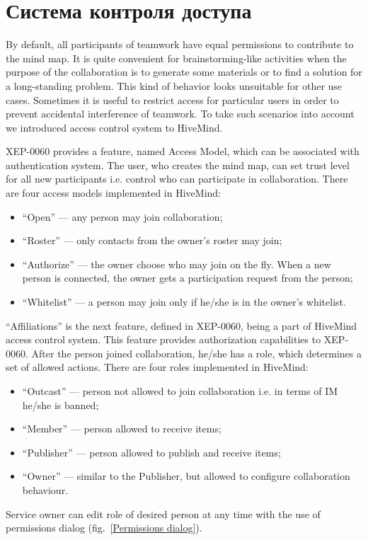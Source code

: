 \section{Система контроля доступа}

By default, all participants of teamwork have equal permissions to contribute to
the mind map. It is quite convenient for brainstorming-like activities when the
purpose of the collaboration is to generate some materials or to find a solution
for a long-standing problem. This kind of behavior looks unsuitable for other
use cases. Sometimes it is useful to restrict access for particular users in
order to prevent accidental interference of teamwork. To take such scenarios
into account we introduced access control system to HiveMind.

XEP-0060 provides a feature, named Access Model, which can be associated with
authentication system. The user, who creates the mind map, can set trust level
for all new participants i.e. control who can participate in collaboration.
There are four access models implemented in HiveMind:
\begin{itemize}
\item ``Open'' --- any person may join collaboration;
\item ``Roster'' --- only contacts from the owner’s roster may join;
\item ``Authorize'' --- the owner choose who may join on the fly. When a new
  person is connected, the owner gets a participation request from the person;
\item ``Whitelist'' --- a person may join only if he/she is in the owner’s
  whitelist.
\end{itemize}

``Affiliations'' is the next feature, defined in XEP-0060, being a part of
HiveMind access control system. This feature provides authorization capabilities
to XEP-0060. After the person joined collaboration, he/she has a role, which
determines a set of allowed actions. There are four roles implemented in
HiveMind:
\begin{itemize}
\item ``Outcast'' --- person not allowed to join collaboration i.e. in terms of
  IM he/she is banned;
\item ``Member'' --- person allowed to receive items;
\item ``Publisher'' --- person allowed to publish and receive items;
\item ``Owner'' --- similar to the Publisher, but allowed to configure
  collaboration behaviour.
\end{itemize}
Service owner can edit role of desired person at any time with the use of
permissions dialog (fig.~\ref{Permissions dialog}).

